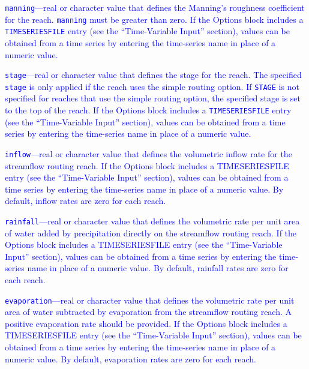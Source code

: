 \item \textcolor{blue}{\texttt{manning}---real or character value that defines the Manning's roughness coefficient for the reach. \texttt{manning} must be greater than zero.  If the Options block includes a \texttt{TIMESERIESFILE} entry (see the ``Time-Variable Input'' section), values can be obtained from a time series by entering the time-series name in place of a numeric value.}

\item \textcolor{blue}{\texttt{stage}---real or character value that defines the stage for the reach. The specified \texttt{stage} is only applied if the reach uses the simple routing option. If \texttt{STAGE} is not specified for reaches that use the simple routing option, the specified stage is set to the top of the reach. If the Options block includes a \texttt{TIMESERIESFILE} entry (see the ``Time-Variable Input'' section), values can be obtained from a time series by entering the time-series name in place of a numeric value.}

\item \textcolor{blue}{\texttt{inflow}---real or character value that defines the volumetric inflow rate for the streamflow routing reach. If the Options block includes a TIMESERIESFILE entry (see the ``Time-Variable Input'' section), values can be obtained from a time series by entering the time-series name in place of a numeric value. By default, inflow rates are zero for each reach.}

\item \textcolor{blue}{\texttt{rainfall}---real or character value that defines the  volumetric rate per unit area of water added by precipitation directly on the streamflow routing reach. If the Options block includes a TIMESERIESFILE entry (see the ``Time-Variable Input'' section), values can be obtained from a time series by entering the time-series name in place of a numeric value. By default, rainfall  rates are zero for each reach.}

\item \textcolor{blue}{\texttt{evaporation}---real or character value that defines the  volumetric rate per unit area of water subtracted by evaporation from the streamflow routing reach. A positive evaporation rate should be provided. If the Options block includes a TIMESERIESFILE entry (see the ``Time-Variable Input'' section), values can be obtained from a time series by entering the time-series name in place of a numeric value. By default, evaporation rates are zero for each reach.}

